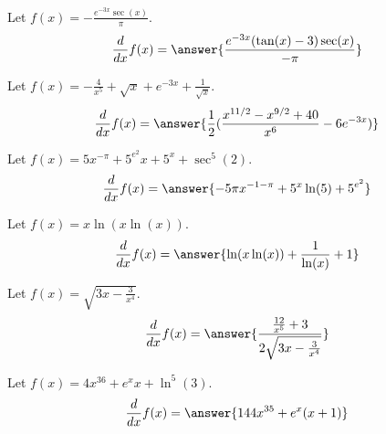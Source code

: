 \documentclass{ximera}
\begin{document}
\begin{shuffle}
\begin{exercise}
Let $f(x)=-\frac{e^{-3 x} \sec (x)}{\pi }$.
\[
\ddx f(x) = \answer{\frac{e^{-3 x} (\tan (x)-3) \sec (x)}{-\pi }}
\]
\end{exercise}

\begin{exercise}
Let $f(x)=-\frac{4}{x^5}+\sqrt{x}+e^{-3 x}+\frac{1}{\sqrt{x}}$.
\[
\ddx f(x) = \answer{\frac{1}{2} (\frac{x^{11/2}-x^{9/2}+40}{x^6}-6 e^{-3 x})}
\]
\end{exercise}


\begin{exercise}
Let $f(x)=5 x^{-\pi }+5^{e^2} x+5^x+\sec ^5(2)$.
\[
\ddx f(x) = \answer{-5 \pi  x^{-1-\pi }+5^x \ln (5)+5^{e^2}}
\]
\end{exercise}



\begin{exercise}
Let $f(x)=x \ln (x \ln (x))$.
\[
\ddx f(x) = \answer{\ln (x \ln (x))+\frac{1}{\ln (x)}+1}
\]
\end{exercise}

\begin{exercise}
Let $f(x)=\sqrt{3 x-\frac{3}{x^4}}$.
\[
\ddx f(x) = \answer{\frac{\frac{12}{x^5}+3}{2 \sqrt{3 x-\frac{3}{x^4}}}}
\]
\end{exercise}

\begin{exercise}
Let $f(x)=4 x^{36}+e^x x+\ln ^5(3)$.
\[
\ddx f(x) = \answer{144 x^{35}+e^x (x+1)}
\]
\end{exercise}


\end{shuffle}
\end{document}
